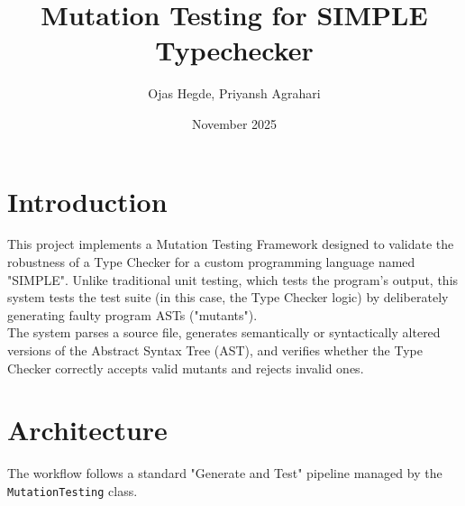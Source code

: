 \documentclass[titlepage]{article}
\title{Mutation Testing for SIMPLE Typechecker}
\author{Ojas Hegde, Priyansh Agrahari}
\date{November 2025}
\begin{document}
\maketitle

\tableofcontents

\newpage

\section{Introduction}

This project implements a Mutation Testing Framework designed to validate the robustness of a Type Checker for a custom programming language named "SIMPLE". Unlike traditional unit testing, which tests the program's output, this system tests the test suite (in this case, the Type Checker logic) by deliberately generating faulty program ASTs ("mutants"). \\
The system parses a source file, generates semantically or syntactically altered versions of the Abstract Syntax Tree (AST), and verifies whether the Type Checker correctly accepts valid mutants and rejects invalid ones.

\section{Architecture}

The workflow follows a standard "Generate and Test" pipeline managed by the \texttt{MutationTesting} class.
\end{document}

